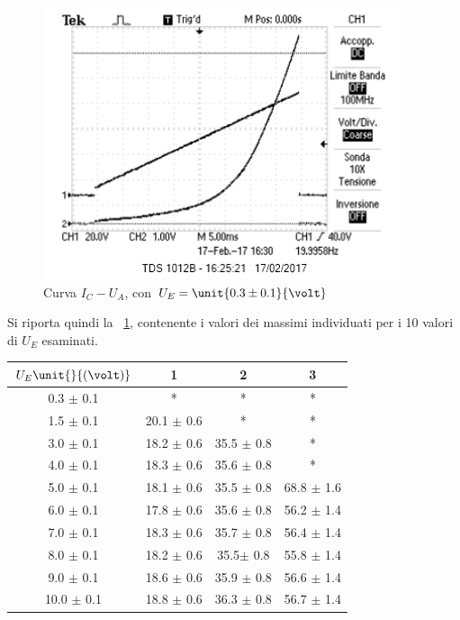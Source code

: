 \documentclass[10pt,a4paper]{article}
\begin{document}
\begin{figure}[H]
\begin{minipage}{0.55\textwidth}
		\includegraphics[width=0.95\textwidth]{../oscilloscopio/Task9_0.png}
		\caption{Curva $I_{C} - U_{A}$, con $U_E = \unit{0.3 \pm 0.1}{\volt}$}
		\label{fig:UEex3}
	\end{minipage}
\end{figure}

Si riporta quindi la \tablename{~\ref{tab:maxfit}}, contenente i valori dei massimi individuati per i 10 valori di $U_E$ esaminati.

\begin{table}[h!]
	\centering
	\begin{tabular}{c|c|c|c}
		\hline
		$U_E \unit{}{(\volt)}$ & 1 & 2 & 3 \\
		\hline 
		0.3 $\pm$ 0.1 & * & * & * \\
		1.5 $\pm$ 0.1 & 20.1 $\pm$ 0.6 & * & *  \\
		3.0 $\pm$ 0.1 & 18.2 $\pm$ 0.6 & 35.5 $\pm$ 0.8 & *  \\
		4.0 $\pm$ 0.1 & 18.3  $\pm$ 0.6 & 35.6 $\pm$ 0.8 & *  \\
		5.0 $\pm$ 0.1 & 18.1  $\pm$ 0.6 & 35.5 $\pm$ 0.8 & 68.8 $\pm$ 1.6 \\
		6.0 $\pm$ 0.1 & 17.8   $\pm$ 0.6 & 35.6 $\pm$ 0.8 & 56.2 $\pm$ 1.4\\
		7.0 $\pm$ 0.1 &18.3 $\pm$ 0.6 & 35.7 $\pm$ 0.8 & 56.4 $\pm$ 1.4 \\
		8.0 $\pm$ 0.1 & 18.2 $\pm$ 0.6 & 35.5$\pm$ 0.8 & 55.8 $\pm$ 1.4 \\
		9.0 $\pm$ 0.1 & 18.6 $\pm$  0.6 & 35.9 $\pm$ 0.8 & 56.6 $\pm$ 1.4 \\
		10.0 $\pm$ 0.1 & 18.8 $\pm$ 0.6 & 36.3 $\pm$ 0.8 & 56.7 $\pm$ 1.4 \\
		\hline
	\end{tabular}
	\label{tab:maxfit}
\end{table}
\end{document}
